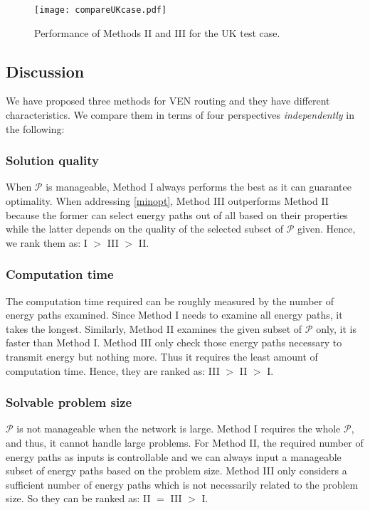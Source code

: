 \documentclass[journal]{IEEEtran}
\begin{document}
\begin{figure}[!t]
\centering
\hspace{-1.0cm}
\texttt{[image: compareUKcase.pdf]}  \vspace{-1cm}
\caption{Performance of Methods II and III for the UK test case.}
\label{fig:UKtest}
\end{figure}


\subsection{Discussion} \label{sec:discussion}
We have proposed  three methods for VEN routing and they have different characteristics. We compare them in terms of four perspectives \textit{independently} in the following:

\subsubsection{Solution quality}
When $\mathcal{P}$ is manageable, Method I always performs the best as it can guarantee optimality. When addressing \eqref{minopt}, Method III outperforms Method II because the former can select energy paths out of all based on their properties while the latter depends on the quality of the selected subset of $\mathcal{P}$ given. Hence, we rank them as: I $>$ III $>$ II.

\subsubsection{Computation time}
The computation time required can be roughly measured by the number of energy paths examined. Since Method I needs to examine all energy paths, it takes the longest. Similarly, Method II examines the given subset of $\mathcal{P}$ only, it is faster than Method I. Method III only check those energy paths necessary to transmit energy but nothing more. Thus it requires the least amount of computation time.  Hence, they are ranked as: III $>$ II $>$ I.

\subsubsection{Solvable problem size}
$\mathcal{P}$  is not manageable when the network is large. Method I requires the whole $\mathcal{P}$, and thus, it cannot handle large problems. For Method II, the required number of energy paths as inputs is controllable and we can always input a manageable subset of energy paths based on the problem size. Method III only considers a sufficient number of energy paths which is not necessarily related to the problem size. So they can be ranked as: II $=$ III $>$ I.
\end{document}
